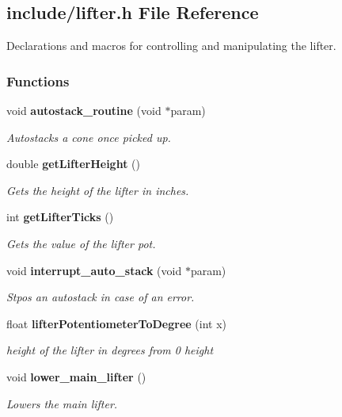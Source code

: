 \subsection{include/lifter.h File Reference}
\label{lifter_8h}


Declarations and macros for controlling and manipulating the lifter.  


\subsubsection*{Functions}
\begin{DoxyCompactItemize}
\item 
void \textbf{ autostack\+\_\+routine} (void $\ast$param)
\begin{DoxyCompactList}\small\item\em Autostacks a cone once picked up. \end{DoxyCompactList}\item 
double \textbf{ get\+Lifter\+Height} ()
\begin{DoxyCompactList}\small\item\em Gets the height of the lifter in inches. \end{DoxyCompactList}\item 
int \textbf{ get\+Lifter\+Ticks} ()
\begin{DoxyCompactList}\small\item\em Gets the value of the lifter pot. \end{DoxyCompactList}\item 
void \textbf{ interrupt\+\_\+auto\+\_\+stack} (void $\ast$param)
\begin{DoxyCompactList}\small\item\em Stpos an autostack in case of an error. \end{DoxyCompactList}\item 
float \textbf{ lifter\+Potentiometer\+To\+Degree} (int x)
\begin{DoxyCompactList}\small\item\em height of the lifter in degrees from 0 height \end{DoxyCompactList}\item 
void \textbf{ lower\+\_\+main\+\_\+lifter} ()
\begin{DoxyCompactList}\small\item\em Lowers the main lifter. \end{DoxyCompactList}\item 

\end{DoxyCompactItemize}
